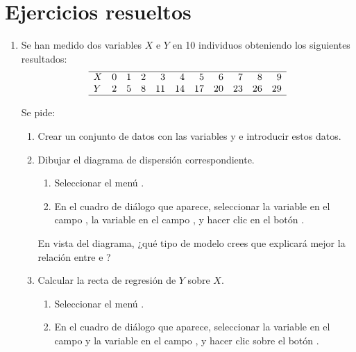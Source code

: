 \section{Ejercicios resueltos}
\begin{enumerate}[leftmargin=*]
\item Se han medido dos variables $X$ e $Y$ en 10 individuos obteniendo los siguientes resultados:
\[
\begin{array}{lrrrrrrrrrr}
\hline
X & 0 & 1 & 2 & 3 & 4 & 5 & 6 & 7 & 8 & 9 \\
Y & 2 & 5 & 8 & 11 & 14 & 17 & 20 & 23 & 26 & 29\\
\hline
\end{array}
\]

Se pide:

\begin{enumerate}
\item  Crear un conjunto de datos con las variables  y  e introducir estos datos.
\item  Dibujar el diagrama de dispersión correspondiente.
\begin{indicacion}
\begin{enumerate}
\item Seleccionar el menú .
\item En el cuadro de diálogo que aparece, seleccionar la variable  en el campo , la
variable  en el campo , y hacer clic en el botón .
\end{enumerate}
\end{indicacion}

En vista del diagrama, ¿qué tipo de modelo crees que explicará mejor la relación entre  e ?

\item Calcular la recta de regresión de $Y$ sobre $X$.
\begin{indicacion}
\begin{enumerate}
\item Seleccionar el menú .
\item En el cuadro de diálogo que aparece, seleccionar la variable  en el campo  y la variable  en el campo , y hacer clic sobre el botón
.
\end{enumerate}
\end{indicacion}


\end{enumerate}
\end{enumerate}
